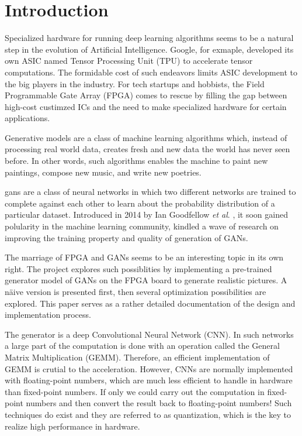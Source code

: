 
\chapter{Introduction}

Specialized hardware for running deep learning algorithms seems to be a natural step in the evolution of
Artificial Intelligence.  Google, for exmaple, developed its own ASIC named Tensor Processing Unit (TPU)
to accelerate tensor computations. The formidable cost of such endeavors limits ASIC development to the big
players in the industry. For tech startups and hobbists, the Field Programmable Gate Array (FPGA) comes to
rescue by filling the gap between high-cost custimzed ICs and the need to make specialized hardware for certain
applications.

Generative models are a class of machine learning algorithms which, instead of processing real world data,
creates fresh and new data the world has never seen before. In other words, such algorithms enables
the machine to paint new paintings, compose new music, and write new poetries.

\gls{gans} are a class of neural networks in which two different networks are
trained to complete against each other to learn about the probability distribution of a particular dataset.
Introduced in 2014 by Ian Goodfellow \textit{et al}. \cite{goodfellow:gan}, it soon gained polularity in the machine learning
community, kindled a wave of research on improving the training property and quality of generation of GANs.

The marriage of FPGA and GANs seems to be an interesting topic in its own right. The project explores such
possiblities by implementing a pre-trained generator model of GANs on the FPGA board to generate realistic
pictures. A näive version is presented first, then several optimization possibilities are explored. This
paper serves as a rather detailed documentation of the design and implementation process.

The generator is a deep Convolutional Neural Network (CNN). In such networks a large part of the computation is
done with an operation called the General Matrix Multiplication (GEMM). Therefore, an efficient implementation
of GEMM is crutial to the acceleration. However, CNNs are normally implemented with floating-point numbers,
which are much less efficient to handle in hardware than fixed-point numbers. If only we could carry out
the computation in fixed-point numbers and then convert the result back to floating-point numbers! Such
techniques do exist and they are referred to as quantization, which is the key to realize high performance
in hardware.

\clearpage %
